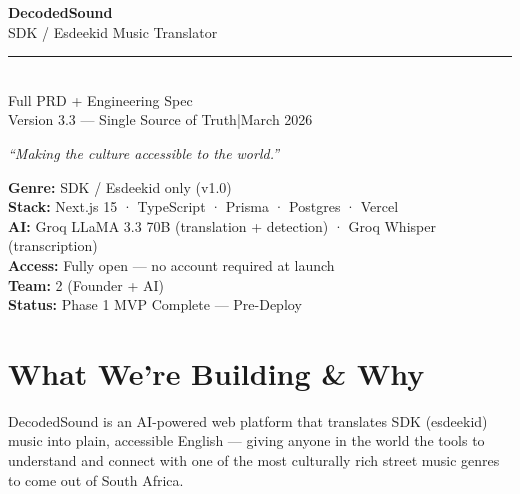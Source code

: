 \documentclass[12pt, a4paper]{article}
\begin{document}

\begin{titlepage}
  \pagecolor{darkbg}\color{white}
  \vspace*{2cm}
  \begin{center}
    {\fontsize{46}{54}\selectfont\bfseries DecodedSound}\\[0.5em]
    {\Large\color{brandlight} SDK / Esdeekid Music Translator}\\[1em]
    \textcolor{brandpurple}{\rule{10cm}{1.5pt}}\\[1em]
    {\large Full PRD + Engineering Spec}\\[0.3em]
    {\normalsize\color{midgray}
      Version 3.3 — Single Source of Truth\quad|\quad March 2026}\\[2cm]
    \begin{tcolorbox}[calloutbox,
        colback=darkbg!60, colframe=brandpurple, width=12cm]
      \centering\color{white}\itshape
      ``Making the culture accessible to the world.''
    \end{tcolorbox}
    \vfill
    {\small\color{midgray}
      \textbf{Genre:} SDK / Esdeekid only (v1.0)\\[0.3em]
      \textbf{Stack:} Next.js 15 · TypeScript · Prisma · Postgres · Vercel\\[0.3em]
      \textbf{AI:} Groq LLaMA 3.3 70B (translation + detection) · Groq Whisper (transcription)\\[0.3em]
      \textbf{Access:} Fully open — no account required at launch\\[0.3em]
      \textbf{Team:} 2 (Founder + AI)\\[0.3em]
      \textbf{Status:} \textcolor{successgreen}{\textbullet}\enspace
        Phase 1 MVP Complete — Pre-Deploy
    }
  \end{center}
\end{titlepage}

\pagecolor{white}\color{darkbg}
\newpage
\tableofcontents
\newpage

\section{What We're Building \& Why}

\begin{tcolorbox}[calloutbox, title={The One-Line Pitch}]
  DecodedSound is an AI-powered web platform that translates SDK (esdeekid)
  music into plain, accessible English — giving anyone in the world the tools
  to understand and connect with one of the most culturally rich street music
  genres to come out of South Africa.
\end{tcolorbox}
\end{document}
